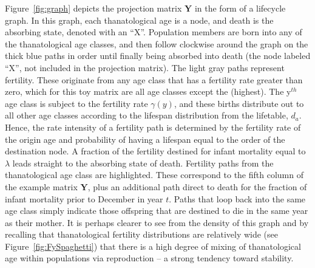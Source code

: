 \documentclass{article}
\begin{document}
Figure~\ref{fig:graph} depicts the projection matrix $\textbf{Y}$ in the form of
a lifecycle graph.  In this graph, each thanatological age is a node, and death
is the absorbing state, denoted with an ``X''.
Population members are born into any of the thanatological age classes, and then follow
clockwise around the graph on the thick blue paths in order until finally being
absorbed into death (the node labeled ``X'', not included in the projection
matrix). The light gray paths represent fertility. These originate from any age class that has a fertility rate greater than zero, which for this toy matrix are all age classes except the 
(highest). The y$^{th}$ age class is subject to the fertility rate $\gamma
(y)$, and these births distribute out to all other age classes according to the
lifespan distribution from the lifetable, $d_a$. Hence, the rate intensity of a
fertility path is determined by the fertility rate of the origin age and
probability of having a lifespan equal to the order of the destination node.  A fraction of
the fertility destined for infant mortality equal to $\lambda$ leads straight to the absorbing state of death. 
Fertility paths from the  thanatological age
class are highlighted.
These correspond to the fifth column of the example matrix $\textbf{Y}$, plus an additional path direct to death for the fraction of infant mortality prior to December 
in year $t$. Paths that loop back into the same age class simply indicate those
offspring that are destined to die in the same year as their mother. It is
perhaps clearer to see from the density of this graph and by recalling that
thanatological fertility distributions are relatively wide (see
Figure~\ref{fig:FySpaghetti}) that there is a high degree of mixing of
thanatological age within populations via reproduction -- a strong tendency
toward stability.
\end{document}
